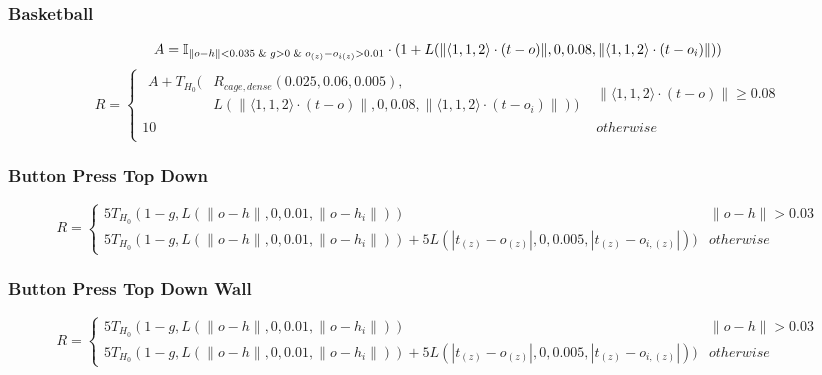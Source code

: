 {\subsubsection{Basketball}
\begin{align*}
A=\mathbb{I}_{\lVert o - h \rVert < 0.035 \And g > 0 \And o_{(z)} - o_{i(z)} > 0.01} \cdot
    (1 + L(\lVert \langle1,1,2\rangle \cdot (t - o) \rVert, 0, 0.08, \lVert \langle1,1,2\rangle \cdot (t - o_i) \rVert))
\end{align*}
\[
R=\left\{
  \begin{array}{ll}
\begin{aligned}
  A + T_{H_0}(& R_{cage,dense}(0.025,0.06,0.005), \\
              & L(\lVert \langle1,1,2\rangle \cdot (t - o) \rVert, 0, 0.08, \lVert \langle1,1,2\rangle \cdot (t - o_i) \rVert))
\end{aligned} & \lVert \langle1,1,2\rangle \cdot (t - o) \rVert\geq 0.08  \\
10 & otherwise \\
  \end{array}\right.
\]

\subsubsection{Button Press Top Down}
\[R=\left\{
\begin{array}{ll}
      5T_{H_0}(
        1-g,
        L(\lVert o - h \rVert, 0, 0.01, \lVert o - h_i \rVert))
        & \lVert o - h \rVert > 0.03 \\
      5T_{H_0}(
        1-g,
        L(\lVert o - h \rVert, 0, 0.01, \lVert o - h_i \rVert)) +
        5L(| t_{(z)} - o_{(z)} |, 0, 0.005, | t_{(z)} - o_{i,(z)} |))
        & otherwise
\end{array} \right. \]

\subsubsection{Button Press Top Down Wall}
\[R=\left\{
\begin{array}{ll}
      5T_{H_0}(
        1-g,
        L(\lVert o - h \rVert, 0, 0.01, \lVert o - h_i \rVert))
        & \lVert o - h \rVert > 0.03 \\
      5T_{H_0}(
        1-g,
        L(\lVert o - h \rVert, 0, 0.01, \lVert o - h_i \rVert)) +
        5L(| t_{(z)} - o_{(z)} |, 0, 0.005, | t_{(z)} - o_{i,(z)} |))
        & otherwise
\end{array} \right. \]

}
